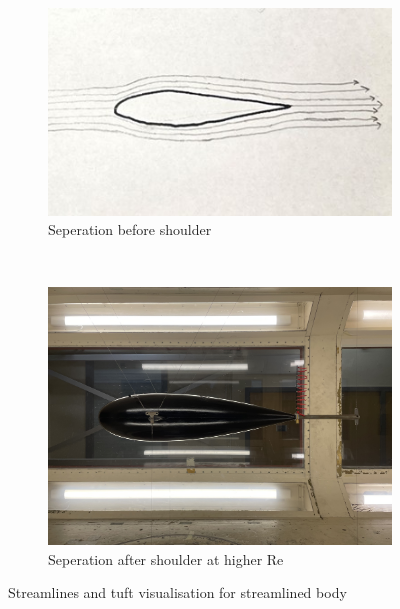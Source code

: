 \documentclass[8pt]{article}
\begin{document}
\begin{figure}[H]
    \centering
    \begin{subfigure}[t]{0.48\textwidth}
        \centering
        \includegraphics[width=1\textwidth]{Images_Videos/stream_streamlined.jpg}
        \caption{Seperation before shoulder}
        \label{fig:figure10}
    \end{subfigure}
    ~
    \begin{subfigure}[t]{0.48\textwidth}
        \centering
        \includegraphics[width=1\textwidth]{Images_Videos/Streamlined_8milibar.JPG}
        \caption{Seperation after shoulder at higher Re}
        \label{fig:figure11}
    \end{subfigure}
    \caption{Streamlines and tuft visualisation for streamlined body}
\end{figure}
\end{document}
